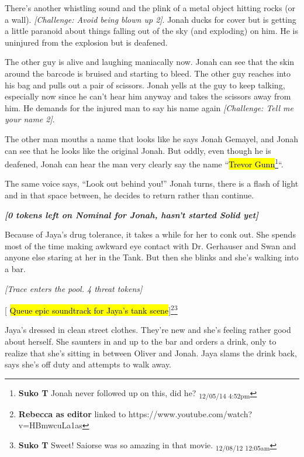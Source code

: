 There's another whistling sound and the plink of a metal object hitting rocks (or a wall).  \textit{{[}Challenge: Avoid being blown up 2{]}}.  Jonah ducks for cover but is getting a little paranoid about things falling out of the sky (and exploding) on him.  He is uninjured from the explosion but is deafened. 



The other guy is alive and laughing maniacally now.  Jonah can see that the skin around the barcode is bruised and starting to bleed.  The other guy reaches into his bag and pulls out a pair of scissors.  Jonah yells at the guy to keep talking, especially now since he can't hear him anyway and takes the scissors away from him.  He demands for the injured man to say his name again  \textit{{[}Challenge: Tell me your name 2{]}}.



The other man mouths a name that looks like he says Jonah Gemayel, and Jonah can see that he looks like the original Jonah.  But oddly, even though he is deafened, Jonah can hear the man very clearly say the name ``\hl{Trevor Gunn}\footnote{\textbf{Suko T }Jonah never followed up on this, did he? \textsubscript{12/05/14 4:52pm}}``.



The same voice says, ``Look out behind you!''  Jonah turns, there is a flash of light and in that space between, he decides to return rather than continue.



\textit{\textbf{{[}0 tokens left on Nominal for Jonah, hasn't started Solid yet{]}}}

\newpage
{}

Because of Jaya's drug tolerance, it takes a while for her to conk out.  She spends most of the time making awkward eye contact with Dr. Gerhauser and Swan and anyone else staring at her in the Tank.  But then she blinks and she's walking into a bar.



\textit{{[}Trace enters the pool.  4 threat tokens{]}}

{[} \hl{Queue epic soundtrack for Jaya's tank scene}{]}\footnote{\textbf{Rebecca as editor} linked to https://www.youtube.com/watch?v=HBmwcuLa1as}\footnote{\textbf{Suko T }Sweet!  Saiorse was so amazing in that movie. \textsubscript{12/08/12 12:05am}}



Jaya's dressed in clean street clothes.  They're new and she's feeling rather good about herself.  She saunters in and up to the bar and orders a drink, only to realize that she's sitting in between Oliver and Jonah.  Jaya slams the drink back, says she's off duty and attempts to walk away.



